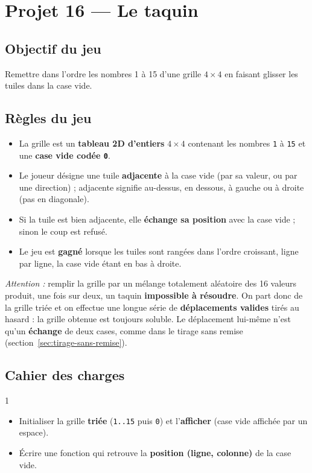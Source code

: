 \section{Projet 16 — Le taquin}
\setcounter{UPSTInumeroCahier des charges}{0}

\subsection*{Objectif du jeu}
Remettre dans l'ordre les nombres 1 à 15 d'une grille $4\times4$ en faisant glisser les tuiles dans la case vide.

\subsection*{Règles du jeu}
\begin{itemize}
  \item La grille est un \textbf{tableau 2D d'entiers} $4\times4$ contenant les nombres \texttt{1} à \texttt{15} et une \textbf{case vide codée \texttt{0}}.
  \item Le joueur désigne une tuile \textbf{adjacente} à la case vide (par sa valeur, ou par une direction) ; adjacente signifie au-dessus, en dessous, à gauche ou à droite (pas en diagonale).
  \item Si la tuile est bien adjacente, elle \textbf{échange sa position} avec la case vide ; sinon le coup est refusé.
  \item Le jeu est \textbf{gagné} lorsque les tuiles sont rangées dans l'ordre croissant, ligne par ligne, la case vide étant en bas à droite.
\end{itemize}

\textit{Attention :} remplir la grille par un mélange totalement aléatoire des 16 valeurs produit, une fois sur deux, un taquin \textbf{impossible à résoudre}. On part donc de la grille triée et on effectue une longue série de \textbf{déplacements valides} tirés au hasard : la grille obtenue est toujours soluble. Le déplacement lui-même n'est qu'un \textbf{échange} de deux cases, comme dans le tirage sans remise (section~\ref{sec:tirage-sans-remise}).

\subsection*{Cahier des charges}
\begin{UPSTICahierDesCharges}{1}
\begin{itemize}
  \item Initialiser la grille \textbf{triée} (\texttt{1..15} puis \texttt{0}) et l'\textbf{afficher} (case vide affichée par un espace).
  \item Écrire une fonction qui retrouve la \textbf{position (ligne, colonne)} de la case vide.
\end{itemize}
\end{UPSTICahierDesCharges}

